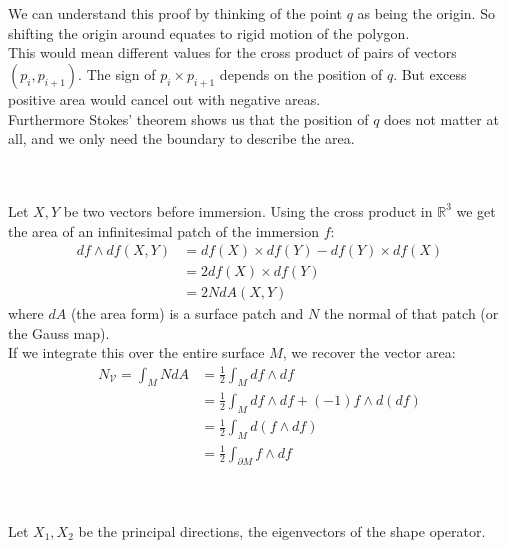 \documentclass{article}
\newcommand\ifrac[2]{{\displaystyle\frac{#1}{#2}}}
\def\hal{\ifrac{1}{2}}
\def\R{\mathbb{R}}
\def\R{\mathbb{R}}
\begin{document}
\vspace{1.8cm}
\\\\


We can understand this proof by thinking of the point $q$ as being the origin. So shifting the origin around equates to 
rigid motion of the polygon.\\ This would mean different values 
for the cross product of pairs of vectors $(p_i, p_{i+1})$. The sign of $p_i \times p_{i+1}$ depends on the position of $q$.
But excess positive area would cancel out with negative areas.\\
Furthermore Stokes' theorem shows us that the position of $q$ does not matter at all, and we only need the boundary
to describe the area.


\vspace{1.8cm}
\\\\


Let $X, Y$ be two vectors before immersion. Using the cross product in $\R^3$ we get the area of an infinitesimal patch
of the immersion $f$:
\begin{align*}
    df \wedge df(X, Y) &= df(X) \times df(Y) - df(Y) \times df(X)\\
        &= 2df(X) \times df(Y)\\
        &= 2NdA(X, Y)
\end{align*}
where $dA$ (the area form) is a surface patch and $N$ the normal of that patch (or the Gauss map).\\
If we integrate this over the entire surface $M$, we recover the vector area:
\begin{align*}
    N_{\mathcal{V}} = \int_M NdA &=  \hal \int_M df \wedge df\\
        &= \hal \int_M df \wedge df + (-1) f \wedge d(df) \tag*{because $d(df) = 0$}\\
        &= \hal \int_M d(f \wedge df) \\
        &= \hal \int_{\partial M} f \wedge df \tag*{(using Stokes' thorem)}
\end{align*}


\vspace{1.8cm}
\\\\


Let $X_1, X_2$ be the principal directions, the eigenvectors of the shape operator.
\end{document}
